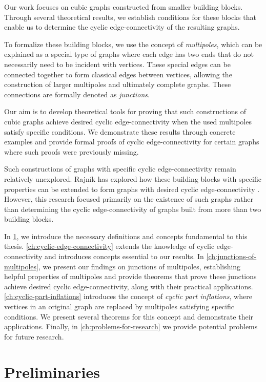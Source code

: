 \documentclass[12pt, twoside]{book}
\begin{document}
Our work focuses on cubic graphs constructed from smaller building blocks. Through several theoretical results, we establish conditions for these blocks that enable us to determine the cyclic \mbox{edge-connectivity} of the resulting graphs.

To formalize these building blocks, we use the concept of \textit{multipoles}, which can be explained as a special type of graphs where each edge has two ends that do not necessarily need to be incident with vertices. These special edges can be connected together to form classical edges between vertices, allowing the construction of larger multipoles and ultimately complete graphs. These connections are formally denoted as \textit{junctions}.

Our aim is to develop theoretical tools for proving that such constructions of cubic graphs achieve desired cyclic edge-connectivity when the used multipoles satisfy specific conditions. We demonstrate these results through concrete examples and provide formal proofs of cyclic edge-connectivity for certain graphs where such proofs were previously missing.

Such constructions of graphs with specific cyclic edge-connectivity remain relatively unexplored. Rajník has explored how these building blocks with specific properties can be extended to form graphs with desired cyclic edge-connectivity \cite{Rajnik_phd}. However, this research focused primarily on the existence of such graphs rather than determining the cyclic edge-connectivity of graphs built from more than two building blocks.

In \cref{ch:preliminaries}, we introduce the necessary definitions and concepts fundamental to this thesis. \cref{ch:cyclic-edge-connectivity} extends the knowledge of cyclic edge-connectivity and introduces concepts essential to our results. In \cref{ch:junctions-of-multipoles}, we present our findings on junctions of multipoles, establishing helpful properties of multipoles and provide theorems that prove these junctions achieve desired cyclic edge-connectivity, along with their practical applications. \cref{ch:cyclic-part-inflations} introduces the concept of \textit{cyclic part inflations}, where vertices in an original graph are replaced by multipoles satisfying specific conditions. We present several theorems for this concept and demonstrate their applications. Finally, in \cref{ch:problems-for-research} we provide potential problems for future research.

\chapter{Preliminaries}\label{ch:preliminaries}
\end{document}
